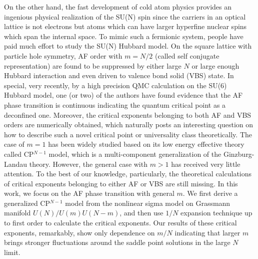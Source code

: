 \documentclass[aps,twocolumn,superscriptaddress]{revtex4-1}
\begin{document}
On the other hand, the fast development of cold atom physics provides an ingenious physical realization of the SU(N) spin since the carriers in an optical lattice is not electrons but atoms which can have larger hyperfine nuclear spins which span the internal space. \cite{wu2003,*wu2005,*wu2006,honerkamp2004,taie2010,desalvo2010,krauser2012,zhang2014,hart2015} To mimic such a fermionic system, people have paid much effort to study the SU(N) Hubbard model. \cite{honerkamp2004,assaad2005,cai2013a,cai2013,wang2014,zhou2014,*zhou2016,*zhou2017} On the square lattice with particle hole symmetry, AF order with $m=N/2$ (called self conjugate representation) are found to be suppressed by either large $N$ or large enough Hubbard interaction and even driven to valence bond solid (VBS) state. \cite{cai2013,wang2014} In special, very recently, by a high precision QMC calculation on the SU(6) Hubbard model, one (or two) of the authors have found evidence that the AF phase transition is continuous indicating the quantum critical point as a deconfined one. \cite{wang2014,wang2018} Moreover, the critical exponents belonging to both AF and VBS orders are numerically obtained, which naturally posts an interesting question on how to describe such a novel critical point or universality class theoretically. The case of $m=1$ has been widely studied based on its low energy effective theory called CP$^{N-1}$ model, which is a multi-component generalization of the Ginzburg-Landau theory. \cite{halperin1974,hikami1979,read1989,read1989a,starykh1994,irkhin1996,kaul2008,block2013,demidio2017} However, the general case with $m>1$ has received very little attention. \cite{macfarlane1979,hikami1980,duerksen1981,maharana1983} To the best of our knowledge, particularly, the theoretical calculations of critical exponents belonging to either AF or VBS are still missing. In this work, we focus on the AF phase transition with general $m$. We first derive a generalized CP$^{N-1}$ model from the nonlinear sigma model on Grassmann manifold $U(N)/U(m)U(N-m)$, and then use $1/N$ expansion technique up to first order to calculate the critical exponents. Our results of these critical exponents, remarkably, show only dependence on $m/N$ indicating that larger $m$ brings stronger fluctuations around the saddle point solutions in the large $N$ limit.
\end{document}
